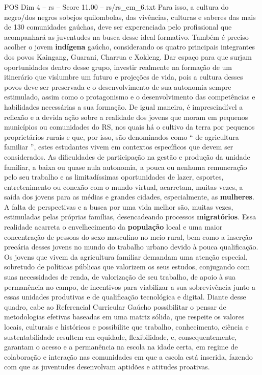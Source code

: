 \begin{textsample}{POS Dim 4 – rs – Score 11.00 – rs/rs\_em\_6.txt}
Para isso, a cultura do negro/dos negros sobejos quilombolas, das vivências, culturas e saberes das mais de 130 comunidades gaúchas, deve ser experenciada pelo profissional que acompanhará as juventudes na busca desse ideal formativo.
Também é preciso acolher o jovem \textbf{indígena} gaúcho, considerando os quatro principais integrantes dos povos Kaingang, Guarani, Charrua e Xokleng.
Dar espaço para que surjam oportunidades dentro desse grupo, investir realmente na formação de um itinerário que vislumbre um futuro e projeções de vida, pois a cultura desses povos deve ser preservada e o desenvolvimento de sua autonomia sempre estimulado, assim como o protagonismo e o desenvolvimento das competências e habilidades necessárias a sua formação.
De igual maneira, é imprescindível a reflexão e a devida ação sobre a realidade dos jovens que moram em pequenos municípios ou comunidades do RS, nos quais há o cultivo da terra por pequenos proprietários rurais e que, por isso, são denominados como “ de agricultura familiar ”, estes estudantes vivem em contextos específicos que devem ser considerados.
As dificuldades de participação na gestão e produção da unidade familiar, a baixa ou quase nula autonomia, a pouca ou nenhuma remuneração pelo seu trabalho e as limitadíssimas oportunidades de lazer, esportes, entretenimento ou conexão com o mundo virtual, acarretam, muitas vezes, a saída dos jovens para as médias e grandes cidades, especialmente, as \textbf{mulheres}.
A falta de perspectivas e a busca por uma vida melhor são, muitas vezes, estimuladas pelas próprias famílias, desencadeando processos \textbf{migratórios}.
Essa realidade acarreta o envelhecimento da \textbf{população} local e uma maior concentração de pessoas do sexo masculino no meio rural, bem como a inserção precária desses jovens no mundo do trabalho urbano devido à pouca qualificação.
Os jovens que vivem da agricultura familiar demandam uma atenção especial, sobretudo de políticas públicas que valorizem os seus estudos, conjugando com suas necessidades de renda, de valorização de seu trabalho, de apoio à sua permanência no campo, de incentivos para viabilizar a sua sobrevivência junto a essas unidades produtivas e de qualificação tecnológica e digital.
Diante desse quadro, cabe ao Referencial Curricular Gaúcho possibilitar o pensar de metodologias efetivas baseadas em uma matriz sólida, que respeite os valores locais, culturais e históricos e possibilite que trabalho, conhecimento, ciência e sustentabilidade resultem em equidade, flexibilidade, e, consequentemente, garantam o acesso e a permanência na escola na idade certa, em regime de colaboração e interação nas comunidades em que a escola está inserida, fazendo com que as juventudes desenvolvam aptidões e atitudes proativas.

\end{textsample}
